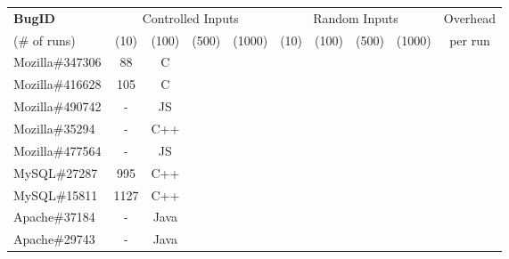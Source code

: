 \begin{table}[h!]
  \centering
  \scriptsize
  \newcommand{\Yes}[1]{\checkmark{}$_#1$}
  \newcommand{\No}[0]{-}
  \begin{tabular}{lccccccccc}
    \toprule     
   {\bf BugID}                   &  \multicolumn{4}{c}{Controlled Inputs}            &     \multicolumn{4}{c}{Random Inputs}          & Overhead \\
                           
    \cmidrule(lr){2-5}
    \cmidrule(lr){6-9}
    (\# of runs)                 &  (10)     &   (100)    &    (500)    & (1000)     &  (10)     &   (100)    &    (500)    & (1000)   &   per run\\
    \midrule 

    Mozilla\#347306              &  88  & C  &  &              &    &                                 &                   &                           &                                \\
    Mozilla\#416628              &  105  & C  &  &              &    &                                 &                   &                           &                               \\
    Mozilla\#490742                  &  -  & JS  &  &              &    &                                 &                   &                           &                                \\
    Mozilla\#35294    &  -  & C++  &  &              &    &                                 &                   &                           &                               \\
    Mozilla\#477564   &  -  & JS  &  &              &    &                                 &                   &                           &                                \\
    \midrule
    MySQL\#27287      &  995  & C++  &  &              &    &                                 &                   &                           &                                \\
    MySQL\#15811      &  1127 & C++  &  &              &    &                                 &                   &                           &                                \\
    \midrule
    Apache\#37184     &  -  & Java  &  &              &    &                                 &                   &                           &                               \\ 
    Apache\#29743     &  -  & Java  &  &              &    &                                 &                   &                           &                              \\

\end{tabular}
\end{table}
